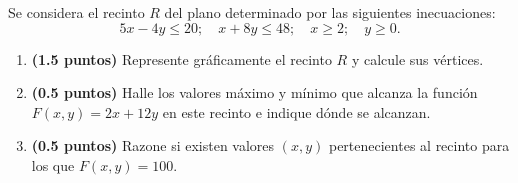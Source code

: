 
Se considera el recinto $R$ del plano determinado por las siguientes inecuaciones:
\[
5x-4y\leq20;\quad x+8y\leq48;\quad x\geq2;\quad y\geq0.
\]
\begin{enumerate}[label=\alph*)]
\item \textbf{(1.5 puntos)} Represente gráficamente el recinto $R$ y calcule sus vértices.
\item \textbf{(0.5 puntos)} Halle los valores máximo y mínimo que alcanza la función $F(x,y)=2x+12y$ en este recinto e indique dónde se alcanzan.
\item \textbf{(0.5 puntos)} Razone si existen valores $(x,y)$ pertenecientes al recinto para los que $F(x,y)=100$.
\end{enumerate}
